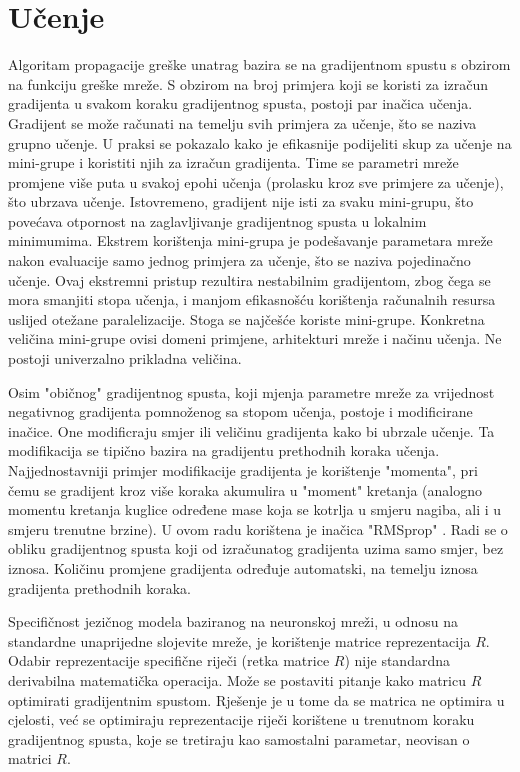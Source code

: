 \documentclass[times, utf8, diplomski, numeric]{fer}
\begin{document}
\section{Učenje}
\label{sec:nnet_training}

Algoritam propagacije greške unatrag bazira se na gradijentnom spustu s obzirom na funkciju greške mreže. S obzirom na broj primjera koji se koristi za izračun gradijenta u svakom koraku gradijentnog spusta, postoji par inačica učenja. Gradijent se može računati na temelju svih primjera za učenje, što se naziva grupno  učenje. U praksi se pokazalo kako je efikasnije podijeliti skup za učenje na mini-grupe  i koristiti njih za izračun gradijenta. Time se parametri mreže promjene više puta u svakoj epohi učenja (prolasku kroz sve primjere za učenje), što ubrzava učenje. Istovremeno, gradijent nije isti za svaku mini-grupu, što povećava otpornost na zaglavljivanje gradijentnog spusta u lokalnim minimumima. Ekstrem korištenja mini-grupa je podešavanje parametara mreže nakon evaluacije samo jednog primjera za učenje, što se naziva pojedinačno  učenje. Ovaj ekstremni pristup rezultira nestabilnim gradijentom, zbog čega se mora smanjiti stopa učenja, i manjom efikasnošću korištenja računalnih resursa uslijed otežane paralelizacije. Stoga se najčešće koriste mini-grupe. Konkretna veličina mini-grupe ovisi domeni primjene, arhitekturi mreže i načinu učenja. Ne postoji univerzalno prikladna veličina.

Osim "običnog" gradijentnog spusta, koji mjenja parametre mreže za vrijednost negativnog gradijenta pomnoženog sa stopom učenja, postoje i modificirane inačice. One modificraju smjer ili veličinu gradijenta kako bi ubrzale učenje. Ta modifikacija se tipično bazira na gradijentu prethodnih koraka učenja. Najjednostavniji primjer modifikacije gradijenta je korištenje "momenta", pri čemu se gradijent kroz više koraka akumulira u "moment" kretanja (analogno momentu kretanja kuglice određene mase koja se kotrlja u smjeru nagiba, ali i u smjeru trenutne brzine). U ovom radu korištena je inačica "RMSprop"  \cite{Tieleman2012}. Radi se o obliku gradijentnog spusta koji od izračunatog gradijenta uzima samo smjer, bez iznosa. Količinu promjene gradijenta određuje automatski, na temelju iznosa gradijenta prethodnih koraka.

Specifičnost jezičnog modela baziranog na neuronskoj mreži, u odnosu na standardne unaprijedne slojevite mreže, je korištenje matrice reprezentacija $R$. Odabir reprezentacije specifične riječi (retka matrice $R$) nije standardna derivabilna matematička operacija. Može se postaviti pitanje kako matricu $R$ optimirati gradijentnim spustom. Rješenje je u tome da se matrica ne optimira u cjelosti, već se optimiraju reprezentacije riječi korištene u trenutnom koraku gradijentnog spusta, koje se tretiraju kao samostalni parametar, neovisan o matrici $R$.
\end{document}
